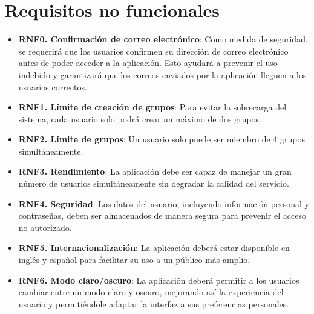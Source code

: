     \section{Requisitos no funcionales}
        \begin{itemize}
        \item \textbf{RNF0. Confirmación de correo electrónico}: Como medida de seguridad, se requerirá que los usuarios confirmen su dirección de correo electrónico antes de poder acceder a la aplicación. Esto ayudará a prevenir el uso indebido y garantizará que los correos enviados por la aplicación lleguen a los usuarios correctos.
        \item \textbf{RNF1. Límite de creación de grupos}: Para evitar la sobrecarga del sistema, cada usuario solo podrá crear un máximo de dos grupos.
        \item \textbf{RNF2. Límite de grupos}: Un usuario solo puede ser miembro de 4 grupos simultáneamente.
        \item \textbf{RNF3. Rendimiento}: La aplicación debe ser capaz de manejar un gran número de usuarios simultáneamente sin degradar la calidad del servicio.
        \item \textbf{RNF4. Seguridad}: Los datos del usuario, incluyendo información personal y contraseñas, deben ser almacenados de manera segura para prevenir el acceso no autorizado.
        \item \textbf{RNF5. Internacionalización}: La aplicación deberá estar disponible en inglés y español para facilitar su uso a un público más amplio.
        \item \textbf{RNF6. Modo claro/oscuro}: La aplicación deberá permitir a los usuarios cambiar entre un modo claro y oscuro, mejorando así la experiencia del usuario y permitiéndole adaptar la interfaz a sus preferencias personales.

    \end{itemize}